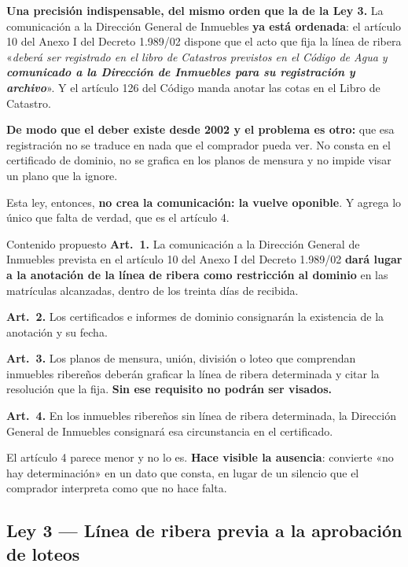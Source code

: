 \begin{cautela}
\textbf{Una precisión indispensable, del mismo orden que la de la Ley 3.} La comunicación a la
Dirección General de Inmuebles \textbf{ya está ordenada}: el artículo 10 del Anexo I del Decreto
1.989/02 dispone que el acto que fija la línea de ribera «\textit{deberá ser registrado en el
libro de Catastros previstos en el Código de Agua y \textbf{comunicado a la Dirección de
Inmuebles para su registración y archivo}}». Y el artículo 126 del Código manda anotar las cotas
en el Libro de Catastro.

\textbf{De modo que el deber existe desde 2002 y el problema es otro:} que esa registración no
se traduce en nada que el comprador pueda ver. No consta en el certificado de dominio, no se
grafica en los planos de mensura y no impide visar un plano que la ignore.

Esta ley, entonces, \textbf{no crea la comunicación: la vuelve oponible}. Y agrega lo único que
falta de verdad, que es el artículo 4.
\end{cautela}

\begin{ficha}{Contenido propuesto}
\textbf{Art.\ 1.} La comunicación a la Dirección General de Inmuebles prevista en el artículo
10 del Anexo I del Decreto 1.989/02 \textbf{dará lugar a la anotación de la línea de ribera como
restricción al dominio} en las matrículas alcanzadas, dentro de los treinta días de recibida.

\textbf{Art.\ 2.} Los certificados e informes de dominio consignarán la existencia de la
anotación y su fecha.

\textbf{Art.\ 3.} Los planos de mensura, unión, división o loteo que comprendan inmuebles
ribereños deberán graficar la línea de ribera determinada y citar la resolución que la fija.
\textbf{Sin ese requisito no podrán ser visados.}

\textbf{Art.\ 4.} En los inmuebles ribereños sin línea de ribera determinada, la Dirección
General de Inmuebles consignará esa circunstancia en el certificado.
\end{ficha}

\begin{cautela}
El artículo 4 parece menor y no lo es. \textbf{Hace visible la ausencia}: convierte «no hay
determinación» en un dato que consta, en lugar de un silencio que el comprador interpreta como
que no hace falta.
\end{cautela}

\subsection{Ley 3 --- Línea de ribera previa a la aprobación de loteos}

